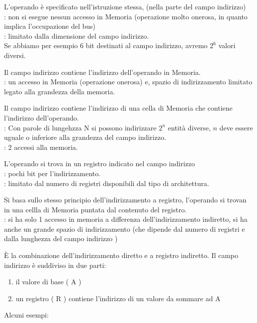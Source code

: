 \documentclass[arch.tex]{subfiles}
\begin{document}
L'operando è specificato nell'istruzione stessa, (nella parte del campo 
indirizzo)\\
: non si esegue nessun accesso in Memoria
(operazione molto onerosa, in quanto implica l'occupazione del bus)\\
: limitato dalla dimensione del campo indirizzo.\\
Se abbiamo per esempio 6 bit destinati al campo indirizzo, avremo  $ 2^6 $ 
valori diversi.


%
\label{sub:diretto}
Il campo indirizzo contiene l'indirizzo dell'operando in Memoria.\\
: un accesso in Memoria (operazione onerosa) e, spazio di indirizzamento 
limitato legato alla grandezza della memoria.


%
\label{sub:indiretto}
Il campo indirizzo contiene l'indirizzo di una cella di Memoria che contiene 
l'indirizzo dell'operando. \\
: Con parole di lungehzza N si possono indirizzare
$ 2^n $ entità diverse, $ n $ deve essere uguale o inferiore alla
grandezza del campo indirizzo.\\
: 2 accessi alla memoria.


%
\label{sub:registro}
L'operando si trova in un registro indicato nel campo indirizzo\\
: pochi bit per l'indirizzamento.\\
: limitato dal numero di registri disponibili dal 
tipo di architettura.


%
\label{sub:registro_indiretto}
Si basa sullo stesso principio dell'indirizzamento a registro, l'operando 
si trovan in una cellla di Memoria puntata dal contenuto del registro.\\
: si ha solo 1 accesso in memoria a differenza dell'indirizzamento indiretto,
si ha anche un grande spazio di indirizzamento (che dipende dal numero di registri e dalla
lunghezza del campo indirizzo )

%
\label{sub:spiazzamento}
È la combinazione dell'indirizzamento diretto e a registro indiretto. Il campo indirizzo
è suddiviso in due parti:

\begin{enumerate}
	\item il valore di base ( A )
	\item un registro  ( R ) contiene l'indirizzo di un valore da sommare ad A
\end{enumerate}
Alcuni esempi:
\end{document}
